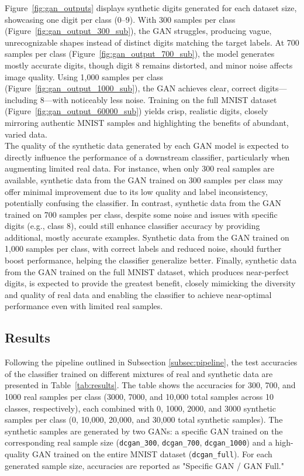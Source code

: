 \documentclass[12pt]{article}
\begin{document}
Figure~\ref{fig:gan_outputs} displays synthetic digits generated for each dataset size, showcasing one digit per class (0--9). With 300 samples per class (Figure~\ref{fig:gan_output_300_sub}), the GAN struggles, producing vague, unrecognizable shapes instead of distinct digits matching the target labels. At 700 samples per class (Figure~\ref{fig:gan_output_700_sub}), the model generates mostly accurate digits, though digit 8 remains distorted, and minor noise affects image quality. Using 1,000 samples per class (Figure~\ref{fig:gan_output_1000_sub}), the GAN achieves clear, correct digits—including 8—with noticeably less noise. Training on the full MNIST dataset (Figure~\ref{fig:gan_output_60000_sub}) yields crisp, realistic digits, closely mirroring authentic MNIST samples and highlighting the benefits of abundant, varied data.\\


The quality of the synthetic data generated by each GAN model is expected to directly influence the performance of a downstream classifier, particularly when augmenting limited real data. For instance, when only 300 real samples are available, synthetic data from the GAN trained on 300 samples per class may offer minimal improvement due to its low quality and label inconsistency, potentially confusing the classifier. In contrast, synthetic data from the GAN trained on 700 samples per class, despite some noise and issues with specific digits (e.g., class 8), could still enhance classifier accuracy by providing additional, mostly accurate examples. Synthetic data from the GAN trained on 1,000 samples per class, with correct labels and reduced noise, should further boost performance, helping the classifier generalize better. Finally, synthetic data from the GAN trained on the full MNIST dataset, which produces near-perfect digits, is expected to provide the greatest benefit, closely mimicking the diversity and quality of real data and enabling the classifier to achieve near-optimal performance even with limited real samples.
\subsection{Results}

Following the pipeline outlined in Subsection \ref{subsec:pipeline}, the test accuracies of the classifier trained on different mixtures of real and synthetic data are presented in Table~\ref{tab:results}. The table shows the accuracies for 300, 700, and 1000 real samples per class (3000, 7000, and 10,000 total samples across 10 classes, respectively), each combined with 0, 1000, 2000, and 3000 synthetic samples per class (0, 10,000, 20,000, and 30,000 total synthetic samples). The synthetic samples are generated by two GANs: a specific GAN trained on the corresponding real sample size (\texttt{dcgan\_300}, \texttt{dcgan\_700}, \texttt{dcgan\_1000}) and a high-quality GAN trained on the entire MNIST dataset (\texttt{dcgan\_full}). For each generated sample size, accuracies are reported as "Specific GAN / GAN Full."
\end{document}
